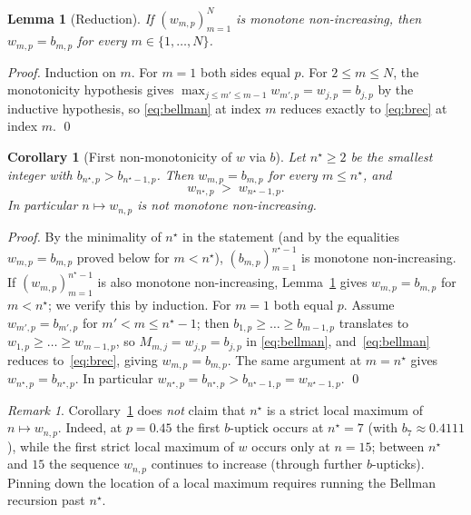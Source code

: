 \documentclass{article}
\newtheorem{lemma}[proposition]{Lemma}
\newtheorem{corollary}[proposition]{Corollary}
\theoremstyle{definition}
\theoremstyle{remark}
\newtheorem*{remark}{Remark}
\begin{document}
\begin{lemma}[Reduction]\label{lem:reduction}
If $(w_{m,p})_{m=1}^{N}$ is monotone non-increasing, then
$w_{m,p}=b_{m,p}$ for every $m\in\{1,\dots,N\}$.
\end{lemma}

\begin{proof}
Induction on $m$. For $m=1$ both sides equal $p$. For $2\le m\le N$, the
monotonicity hypothesis gives
$\max_{j\le m'\le m-1}w_{m',p}=w_{j,p}=b_{j,p}$ by the inductive
hypothesis, so \eqref{eq:bellman} at index $m$ reduces exactly to
\eqref{eq:brec} at index $m$. \qed
\end{proof}

\begin{corollary}[First non-monotonicity of $w$ via $b$]\label{cor:firstmax}
Let $n^{\star}\ge 2$ be the smallest integer with
$b_{n^{\star},p}>b_{n^{\star}-1,p}$. Then $w_{m,p}=b_{m,p}$ for every
$m\le n^{\star}$, and
\begin{equation}\label{eq:first-uptick}
  w_{n^{\star},p}\;>\;w_{n^{\star}-1,p}.
\end{equation}
In particular $n\mapsto w_{n,p}$ is not monotone non-increasing.
\end{corollary}

\begin{proof}
By the minimality of $n^{\star}$ in the statement (and by the
equalities $w_{m,p}=b_{m,p}$ proved below for $m<n^{\star}$),
$(b_{m,p})_{m=1}^{n^{\star}-1}$ is monotone non-increasing. If
$(w_{m,p})_{m=1}^{n^{\star}-1}$ is also monotone non-increasing,
Lemma~\ref{lem:reduction} gives $w_{m,p}=b_{m,p}$ for $m<n^{\star}$; we
verify this by induction. For $m=1$ both equal $p$. Assume
$w_{m',p}=b_{m',p}$ for $m'<m\le n^{\star}-1$; then
$b_{1,p}\ge\dots\ge b_{m-1,p}$ translates to
$w_{1,p}\ge\dots\ge w_{m-1,p}$, so
$M_{m,j}=w_{j,p}=b_{j,p}$ in \eqref{eq:bellman}, and~\eqref{eq:bellman}
reduces to~\eqref{eq:brec}, giving $w_{m,p}=b_{m,p}$. The same
argument at $m=n^{\star}$ gives $w_{n^{\star},p}=b_{n^{\star},p}$. In
particular $w_{n^{\star},p}=b_{n^{\star},p}>b_{n^{\star}-1,p}=w_{n^{\star}-1,p}$.
\qed
\end{proof}

\begin{remark}
Corollary~\ref{cor:firstmax} does \emph{not} claim that $n^{\star}$ is
a strict local maximum of $n\mapsto w_{n,p}$. Indeed, at $p=0.45$ the
first $b$-uptick occurs at $n^{\star}=7$ (with $b_{7}\approx 0.4111$),
while the first strict local maximum of $w$ occurs only at $n=15$;
between $n^{\star}$ and $15$ the sequence $w_{n,p}$ continues to
increase (through further $b$-upticks). Pinning down the location of
a local maximum requires running the Bellman recursion past
$n^{\star}$.
\end{remark}
\end{document}
